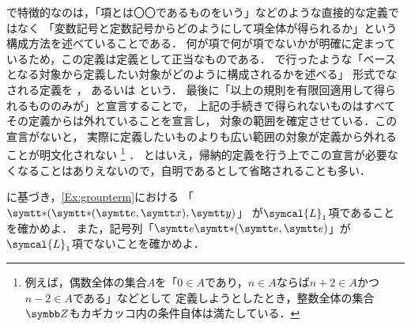 で特徴的なのは，「項とは〇〇であるものをいう」などのような直接的な定義ではなく
「変数記号と定数記号からどのようにして項全体が得られるか」という構成方法を述べていることである．
何が項で何が項でないかが明確に定まっているため，この定義は定義として正当なものである．
で行ったような「ベースとなる対象から定義したい対象がどのように構成されるかを述べる」
形式でなされる定義を%
%
，
あるいは%
%
という．
最後に「以上の規則を有限回適用して得られるもののみが」と宣言することで，
上記の手続きで得られないものはすべてその定義からは外れていることを宣言し，
対象の範囲を確定させている．この宣言がないと，
実際に定義したいものよりも広い範囲の対象が定義から外れることが明文化されない
\footnote{%
	例えば，偶数全体の集合\(A\)を「\(0 \in A\)であり，\(n \in A\)ならば\(n + 2 \in A\)かつ\(n - 2 \in A\)である」などとして
	定義しようとしたとき，整数全体の集合\(\Zahlen\)もカギカッコ内の条件自体は満たしている．
}%
．
とはいえ，帰納的定義を行う上でこの宣言が必要なくなることはありえないので，自明であるとして省略されることも多い．



\begin{Que} \label{Que:termexample}
	に基づき，\cref{Ex:groupterm}における
	「\(\apply{\obj{\ast}}{\apply{\obj{\ast}}{\obj{e}, \obj{x}}, \obj{y}}\)」
	が\(\symcal{L}_1\)項であることを確かめよ．
	また，記号列「\(\obj{e} \apply{\mathord{\obj{\ast}}}{\obj{e}, \obj{e}}\)」が\(\symcal{L}_1\)項でないことを確かめよ．
\end{Que}



